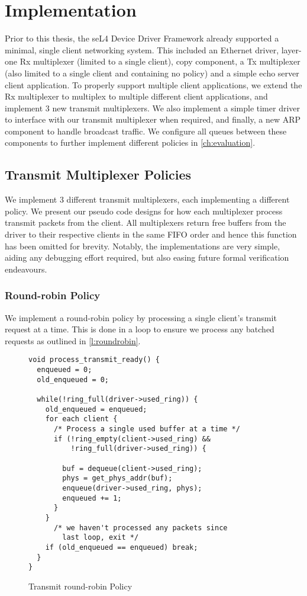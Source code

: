 \chapter{Implementation}\label{ch:implementation}

Prior to this thesis, the seL4 Device Driver Framework already supported a minimal, single client
networking system. This included an Ethernet driver, layer-one Rx multiplexer (limited to a single 
client), copy component, a Tx multiplexer (also limited to a single client and containing no policy) and 
a simple echo server client application. To properly support multiple client applications, we
extend the Rx multiplexer to multiplex to multiple different client applications, and implement 3
new transmit multiplexers. We also implement a simple timer driver to interface with our 
transmit multiplexer when required, and finally, a new ARP component to handle broadcast traffic. 
We configure all queues between these components to further implement different
policies in \autoref{ch:evaluation}.

\section{Transmit Multiplexer Policies}

We implement 3 different transmit multiplexers, each implementing a different policy. 
We present our pseudo code designs for how each multiplexer process transmit packets from
the client. All multiplexers return free buffers from the driver to their respective 
clients in the same FIFO order and hence this function has been omitted for brevity. 
Notably, the implementations are very simple, aiding any debugging effort required, but also
easing future formal verification endeavours.

\subsection{Round-robin Policy}
We implement a round-robin policy by processing a single client's transmit request at a time.
This is done in a loop to ensure we process any batched requests as outlined in \autoref{l:roundrobin}.

\begin{figure} [H]
    \begin{verbatim}
void process_transmit_ready() {
  enqueued = 0;
  old_enqueued = 0;

  while(!ring_full(driver->used_ring)) {
    old_enqueued = enqueued;
    for each client {
      /* Process a single used buffer at a time */
      if (!ring_empty(client->used_ring) &&
          !ring_full(driver->used_ring)) {
        
        buf = dequeue(client->used_ring);
        phys = get_phys_addr(buf);
        enqueue(driver->used_ring, phys);
        enqueued += 1;
      }
    }
      /* we haven't processed any packets since 
        last loop, exit */
    if (old_enqueued == enqueued) break;
  }
}
\end{verbatim}
\caption{Transmit round-robin Policy}
\label{l:roundrobin}
\end{figure}

